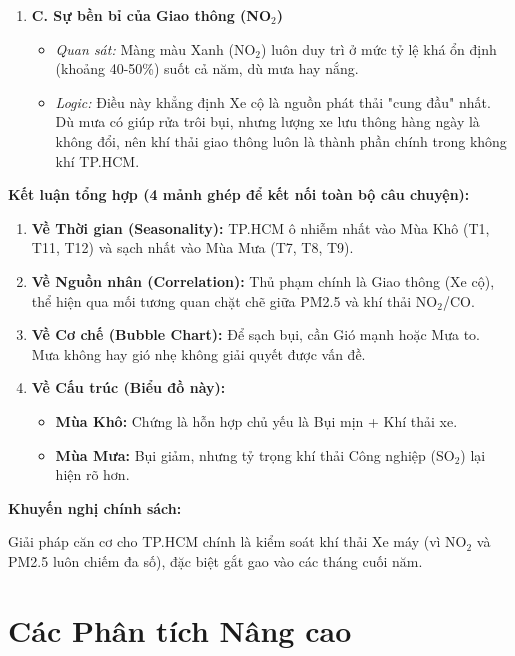 \documentclass[12pt,a4paper]{article}
\begin{document}
\begin{enumerate}
    \item \textbf{C. Sự bền bỉ của Giao thông (NO$_2$)}
    \begin{itemize}
        \item \textit{Quan sát:} Màng màu Xanh (NO$_2$) luôn duy trì ở mức tỷ lệ khá ổn định (khoảng 40-50\%) suốt cả năm, dù mưa hay nắng.
        \item \textit{Logic:} Điều này khẳng định Xe cộ là nguồn phát thải "cung đầu" nhất. Dù mưa có giúp rửa trôi bụi, nhưng lượng xe lưu thông hàng ngày là không đổi, nên khí thải giao thông luôn là thành phần chính trong không khí TP.HCM.
    \end{itemize}
\end{enumerate}

\textbf{Kết luận tổng hợp (4 mảnh ghép để kết nối toàn bộ câu chuyện):}

\begin{enumerate}
    \item \textbf{Về Thời gian (Seasonality):} TP.HCM ô nhiễm nhất vào Mùa Khô (T1, T11, T12) và sạch nhất vào Mùa Mưa (T7, T8, T9).
    
    \item \textbf{Về Nguồn nhân (Correlation):} Thủ phạm chính là Giao thông (Xe cộ), thể hiện qua mối tương quan chặt chẽ giữa PM2.5 và khí thải NO$_2$/CO.
    
    \item \textbf{Về Cơ chế (Bubble Chart):} Để sạch bụi, cần Gió mạnh hoặc Mưa to. Mưa không hay gió nhẹ không giải quyết được vấn đề.
    
    \item \textbf{Về Cấu trúc (Biểu đồ này):}
    \begin{itemize}
        \item \textbf{Mùa Khô:} Chứng là hỗn hợp chủ yếu là Bụi mịn + Khí thải xe.
        \item \textbf{Mùa Mưa:} Bụi giảm, nhưng tỷ trọng khí thải Công nghiệp (SO$_2$) lại hiện rõ hơn.
    \end{itemize}
\end{enumerate}

\textbf{Khuyến nghị chính sách:}

Giải pháp căn cơ cho TP.HCM chính là kiểm soát khí thải Xe máy (vì NO$_2$ và PM2.5 luôn chiếm đa số), đặc biệt gắt gao vào các tháng cuối năm.

\section{Các Phân tích Nâng cao}
\end{document}
